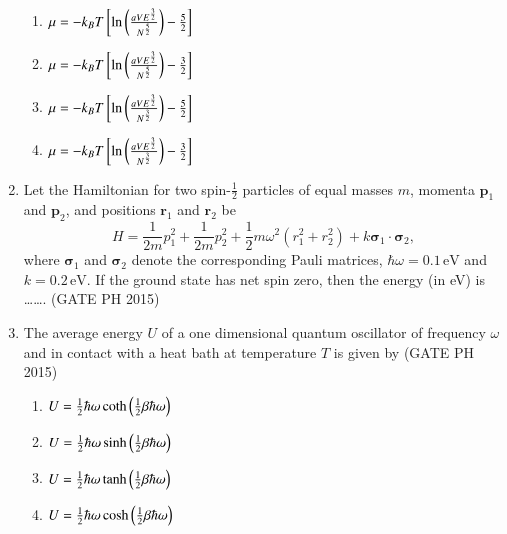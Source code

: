 \documentclass[journal]{IEEEtran}
\begin{document}
\begin{enumerate}
\begin{multicols}{2}
    \begin{enumerate}
        \item $\mu = -k_B T {}\left[ \ln \left( \frac{a V E^{\frac{3}{2}}}{N^{\frac{5}{2}}} \right) - \frac{5}{2} \right]$
        \item $\mu = -k_B T {}\left[ \ln \left( \frac{a V E^{\frac{3}{2}}}{N^{\frac{5}{2}}} \right) - \frac{3}{2} \right]$
    
        \item $\mu = -k_B T {}\left[ \ln \left( \frac{a V E^{\frac{3}{2}}}{N^{\frac{3}{2}}} \right) - \frac{5}{2} \right]$
        \item $\mu = -k_B T {}\left[ \ln \left( \frac{a V E^{\frac{3}{2}}}{N^{\frac{3}{2}}} \right) - \frac{3}{2} \right]$
    \end{enumerate}
\end{multicols}

\item  Let the Hamiltonian for two spin-$\frac{1}{2}$ particles of equal masses $m$, momenta $\bm{p}_1$ and $\bm{p}_2$, and positions $\bm{r}_1$ and $\bm{r}_2$ be 
$$ H = \frac{1}{2m} p_1^2 + \frac{1}{2m} p_2^2 + \frac{1}{2} m \omega^2 (r_1^2 + r_2^2) + k \bm{\sigma}_1 \cdot \bm{\sigma}_2, $$
where $\bm{\sigma}_1$ and $\bm{\sigma}_2$ denote the corresponding Pauli matrices, $\hbar \omega = 0.1 \, \text{eV}$ and $k = 0.2 \, \text{eV}$. If the ground state has net spin zero, then the energy (in eV) is \ldots\ldots. \hfill (GATE PH 2015)

\item The average energy $U$ of a one dimensional quantum oscillator of frequency $\omega$ and in contact with a heat bath at temperature $T$ is given by \hfill (GATE PH 2015)

\begin{multicols}{2}
    \begin{enumerate}
        \item $U = \frac{1}{2} \hbar \omega \coth \left( \frac{1}{2} \beta \hbar \omega \right)$
        \item $U = \frac{1}{2} \hbar \omega \sinh \left( \frac{1}{2} \beta \hbar \omega \right)$
        \item $U = \frac{1}{2} \hbar \omega \tanh \left( \frac{1}{2} \beta \hbar \omega \right)$
        \item $U = \frac{1}{2} \hbar \omega \cosh \left( \frac{1}{2} \beta \hbar \omega \right)$
    \end{enumerate}
\end{multicols}


\end{enumerate}
\end{document}
